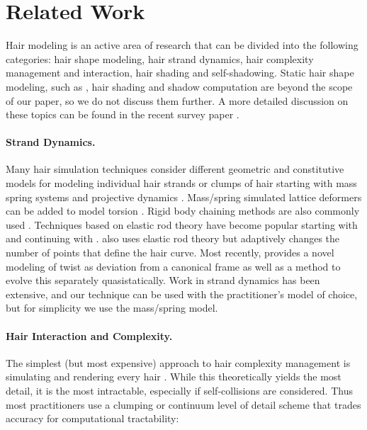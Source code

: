 \section{Related Work}

Hair modeling is an active area of research that can be divided into
the following categories: hair shape modeling, hair strand dynamics,
hair complexity management and interaction, hair shading and self-shadowing.
Static hair shape
modeling, such as
\cite{yu:2001:model-hairstyle,kim:2002:hair,choe:2005:statistical-wisp}, hair
shading and shadow
computation are beyond the scope of our paper, so we do not discuss them
further. A
more detailed discussion on these topics can be found in the recent
survey paper \cite{ward:2007:hairsurvey}.

\paragraph{Strand Dynamics.} Many hair simulation techniques consider different geometric 
and constitutive models
for modeling individual hair strands or clumps of hair starting with
mass spring systems \cite{rosenblum:1991:hair} and projective dynamics
\cite{anjyo:1992:hair}.  Mass/spring simulated lattice deformers can
be added to model torsion
\cite{plante:2002:hair-complexity,selle:2008:hair}.
Rigid body chaining methods are also commonly used
\cite{brown:2004:real-time-knot,choe:2005:simulating-complex-hair,hadap:2006:orientedstrands}.
Techniques based on elastic rod theory have become popular
starting with \cite{pai:2002:strands} and continuing with
\cite{gregoire:2006:interactive-simulation-one-dimensional,bertails:2006:superhelices}.
\cite{spillmann:2007:corde} also uses elastic rod theory but
adaptively changes the number of points that define the hair curve.
Most recently, \cite{bergou:2008:elastic-rods} provides a novel
modeling of twist as deviation from a canonical frame as well as a
method to evolve this separately quasistatically. Work in strand
dynamics has been extensive, and our technique can be used with the
practitioner's model of choice, but for simplicity we use
the mass/spring model.

\paragraph{Hair Interaction and Complexity.}
The simplest (but most expensive) approach to hair complexity
management is simulating and rendering every hair
\cite{rosenblum:1991:hair,anjyo:1992:hair,selle:2008:hair}. While this
theoretically yields the most detail, it is the most intractable,
especially if self-collisions are considered.  Thus most practitioners
use a clumping or continuum level of detail scheme that trades
accuracy for computational tractability:



